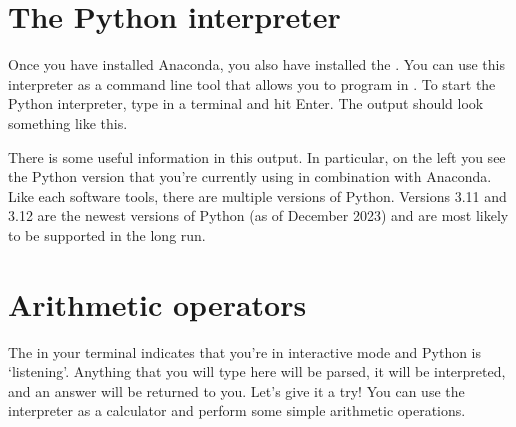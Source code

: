 \documentclass[letterpaper,10pt,english]{jupyterBook}
\begin{document}
\section{The Python interpreter}
\label{\detokenize{notebooks/01_GettingStarted/01_GettingStarted_student:the-python-interpreter}}
\sphinxAtStartPar
Once you have installed Anaconda, you also have installed the . You can use this interpreter as a command line tool that allows you to program in . To start the Python interpreter, type  in a terminal and hit Enter. The output should look something like this.

\begin{sphinxVerbatim}[commandchars=\\\{\}]
            \PYG{p}{[}    \PYG{p}{]}  
        
\end{sphinxVerbatim}

\sphinxAtStartPar
There is some useful information in this output. In particular, on the left you see the Python version that you’re currently using in combination with Anaconda. Like each software tools, there are multiple versions of Python. Versions 3.11 and 3.12 are the newest versions of Python (as of December 2023) and are most likely to be supported in the long run.


\section{Arithmetic operators}
\label{\detokenize{notebooks/01_GettingStarted/01_GettingStarted_student:arithmetic-operators}}
\sphinxAtStartPar
The \sphinxcode{\sphinxupquote{>>>}} in your terminal indicates that you’re in interactive mode and Python is ‘listening’. Anything that you will type here will be parsed, it will be interpreted, and an answer will be returned to you. Let’s give it a try! You can use the interpreter as a calculator and perform some simple arithmetic operations.
\end{document}

